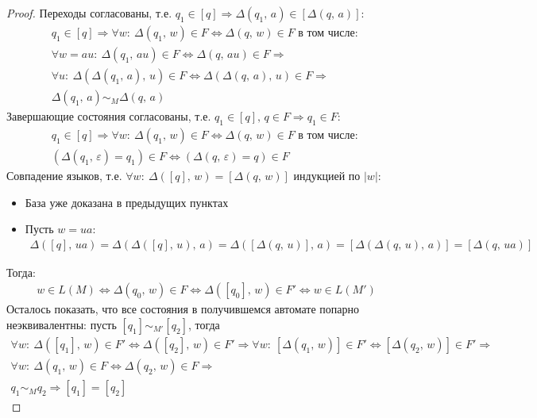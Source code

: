 \documentclass[a4paper,12pt]{article}
\theoremstyle{plain}
\theoremstyle{definition}
\theoremstyle{remark}
\begin{document}
\begin{proof}
	Переходы согласованы, т.е. $q_1 \in [q] \Rightarrow \Delta(q_1,\, a) \in [\Delta(q,\,a)]$:
	\begin{align*}
		q_1 \in [q] \Rightarrow \forall w:\: \Delta(q_1,\,w) \in F \Leftrightarrow \Delta(q,\,w) \in F \text{ в том числе: } \\
		\forall w = au:\: \Delta(q_1,\,au) \in F \Leftrightarrow \Delta(q,\, au) \in F \Rightarrow                           \\
		\forall u:\: \Delta(\Delta(q_1,\,a),\,u) \in F \Leftrightarrow \Delta(\Delta(q,\,a),\,u) \in F \Rightarrow           \\
		\Delta(q_1,\,a) \sim_M \Delta(q,\,a)
	\end{align*}
	Завершающие состояния согласованы, т.е. $q_1 \in [q],\, q \in F \Rightarrow q_1 \in F$:
	\begin{align*}
		q_1 \in [q] \Rightarrow \forall w:\: \Delta(q_1,\,w) \in F \Leftrightarrow \Delta(q,\,w) \in F \text{ в том числе: } \\
		(\Delta(q_1,\,\varepsilon) = q_1) \in F \Leftrightarrow (\Delta(q,\, \varepsilon) = q) \in F
	\end{align*}
	Совпадение языков, т.е. $\forall w :\: \Delta([q],\, w) = [\Delta(q,\,w)]$ индукцией по $|w|$:
	\begin{itemize}
		\item База уже доказана в предыдущих пунктах
		\item Пусть $w = ua$:
		      \begin{align*}
			      \Delta([q],\, ua) = \Delta(\Delta([q],\, u),\, a) = \Delta([\Delta(q,\, u)],\, a) = [\Delta(\Delta(q,\,u),\, a)] = [\Delta(q,\,ua)]
		      \end{align*}
	\end{itemize}
	Тогда:
	\begin{align*}
		w \in L(M) \Leftrightarrow \Delta(q_0,\, w) \in F \Leftrightarrow \Delta([q_0],\, w) \in F' \Leftrightarrow w \in L(M')
	\end{align*}
	Осталось показать, что все состояния в получившемся автомате попарно неэквивалентны: пусть  $[q_1] \sim_{M'} [q_2]$, тогда
	\begin{align*}
		\forall w :\: \Delta([q_1],\, w) \in F' \Leftrightarrow \Delta([q_2],\,w) \in F' \Rightarrow \forall w :\: [\Delta(q_1,\,w)] \in F' \Leftrightarrow [\Delta(q_2,\,w)] \in F' \Rightarrow \\
		\forall w :\: \Delta(q_1,\, w) \in F \Leftrightarrow \Delta(q_2,\,w) \in F \Rightarrow                                                                                                   \\
		q_1 \sim_M q_2 \Rightarrow [q_1] = [q_2]
	\end{align*}

\end{proof}
\end{document}
